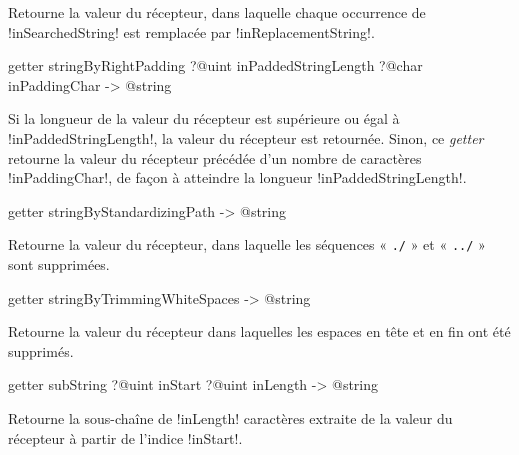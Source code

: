 Retourne la valeur du récepteur, dans laquelle chaque occurrence de \ggs!inSearchedString! est remplacée par \ggs!inReplacementString!.








\begin{galgasbox}
getter stringByRightPadding
   ?@uint inPaddedStringLength
   ?@char inPaddingChar -> @string
\end{galgasbox}

Si la longueur de la valeur du récepteur est supérieure ou égal à \ggs!inPaddedStringLength!, la valeur du récepteur est retournée. Sinon, ce \emph{getter} retourne la valeur du récepteur précédée d'un nombre de caractères \ggs!inPaddingChar!, de façon à atteindre la longueur \ggs!inPaddedStringLength!.





\begin{galgasbox}
getter stringByStandardizingPath -> @string
\end{galgasbox}

Retourne la valeur du récepteur, dans laquelle les séquences « \texttt{./} » et « \texttt{../} » sont supprimées.








\begin{galgasbox}
getter stringByTrimmingWhiteSpaces -> @string
\end{galgasbox}

Retourne la valeur du récepteur dans laquelles les espaces en tête et en fin ont été supprimés.





\begin{galgasbox}
getter subString ?@uint inStart ?@uint inLength -> @string
\end{galgasbox}

Retourne la sous-chaîne de \ggs!inLength! caractères extraite de la valeur du récepteur à partir de l'indice \ggs!inStart!.







